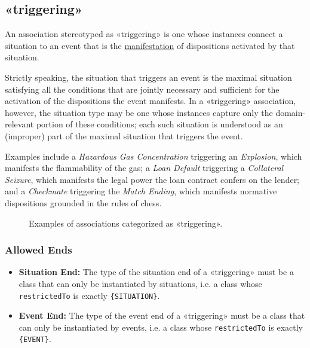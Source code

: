 \subsection{«triggering»}
\label{stereotype:triggering}

An association stereotyped as «triggering» is one whose instances connect a situation to an event that is the \hyperref[stereotype:manifestation]{manifestation} of dispositions activated by that situation. 

Strictly speaking, the situation that triggers an event is the maximal situation satisfying all the conditions that are jointly necessary and sufficient for the activation of the dispositions the event manifests. In a «triggering» association, however, the situation type may be one whose instances capture only the domain-relevant portion of these conditions; each such situation is understood as an (improper) part of the maximal situation that triggers the event.

Examples include a \textit{Hazardous Gas Concentration} triggering an \textit{Explosion}, which manifests the flammability of the gas; a \textit{Loan Default} triggering a \textit{Collateral Seizure}, which manifests the legal power the loan contract confers on the lender; and a \textit{Checkmate} triggering the \textit{Match Ending}, which manifests normative dispositions grounded in the rules of chess.

\begin{figure}[h]
    \centering
    
    \caption{Examples of associations categorized as «triggering».}
    \label{fig:triggering-example}
\end{figure}

\subsubsection{Allowed Ends}

\begin{itemize}
    \item \textbf{Situation End:} The type of the situation end of a «triggering» must be a class that can only be instantiated by situations, i.e. a class whose \texttt{restrictedTo} is exactly \texttt{\{SITUATION\}}.
    \item \textbf{Event End:} The type of the event end of a «triggering» must be a class that can only be instantiated by events, i.e. a class whose \texttt{restrictedTo} is exactly \texttt{\{EVENT\}}.
\end{itemize}


